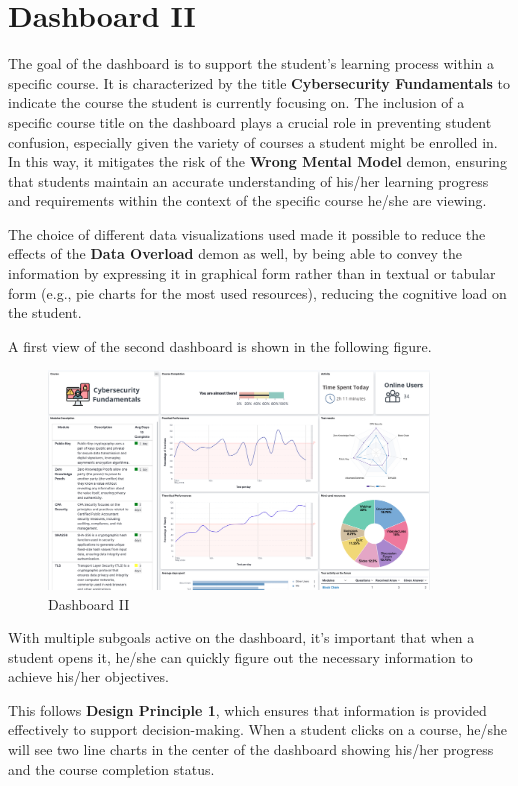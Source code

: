 \section{Dashboard II}

The goal of the dashboard is to support the student's learning process within a specific course. It is characterized by the title \textbf{Cybersecurity Fundamentals} to indicate the course the student is currently focusing on. The inclusion of a specific course title on the dashboard plays a crucial role in preventing student confusion, especially given the variety of courses a student might be enrolled in. 
In this way, it mitigates the risk of the \textbf{Wrong Mental Model} demon, ensuring that students maintain an accurate understanding of his/her learning progress and requirements within the context of the specific course he/she are viewing. 

The choice of different data visualizations used made it possible to reduce the effects of the \textbf{Data Overload} demon as well, by being able to convey the information by expressing it in graphical form rather than in textual or tabular form (e.g., pie charts for the most used resources), reducing the cognitive load on the student. 

A first view of the second dashboard is shown in the following figure.

\begin{figure}[H]
    \centering
    \includegraphics[width=0.9\textwidth]{assets/dashboard_2.png}
    \caption{Dashboard II}
    \label{fig:dashboard_2}
\end{figure}

With multiple subgoals active on the dashboard, it’s important that when a student opens it, he/she can quickly figure out the necessary information to achieve his/her objectives. 

This follows \textbf{Design Principle 1}, which ensures that information is provided effectively to support decision-making. When a student clicks on a course, he/she will see two line charts in the center of the dashboard showing his/her progress and the course completion status.

